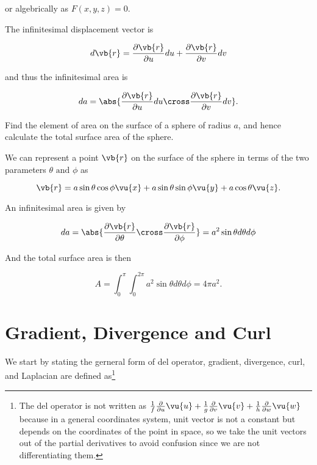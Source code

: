 \documentclass[english,a4paper,12pt]{report}
\begin{document}
or algebrically as \(F(x,y,z) = 0\). 

The infinitesimal displacement vector is 

\begin{equation}
	d\vb{r} = \frac{\partial \vb{r} }{\partial u} du + \frac{\partial \vb{r} }{\partial v}dv 
\end{equation}

and thus the infinitesimal area is 

\begin{equation}
	da = \abs{\frac{\partial \vb{r} }{\partial u} du \cross \frac{\partial \vb{r} }{\partial v} dv}.
\end{equation}

{Find the element of area on the surface of a sphere of radius \(a\), and hence calculate the total surface area of the sphere.}
{We can represent a point \(\vb{r} \)  on the surface of the sphere in terms of the two parameters \(\theta \text { and } \phi \) as

\begin{equation}
	\vb{r} = a \sin \theta \cos \phi \vu{x} + a \sin \theta \sin \phi \vu{y} + a \cos \theta \vu{z} .
\end{equation}

An infinitesimal area is given by 

\begin{equation}
	da = \abs{\frac{\partial \vb{r} }{\partial \theta } \cross \frac{\partial \vb{r} }{\partial \phi } } = a^2\sin \theta d \theta d \phi 
\end{equation}

And the total surface area is then 

\begin{equation}
	A = \int_{0}^{\pi }\int_{0}^{2\pi } a^2 \sin \theta d \theta d \phi = 4\pi a^2.    
\end{equation}
} 












\section{Gradient, Divergence and Curl} 

We start by stating the gerneral form of del operator, gradient, divergence, curl, and Laplacian are defined as\footnote{The del operator is not written as \(\frac{1}{f} \frac{\partial}{\partial u}\vu{u}  + \frac{1}{g} \frac{\partial}{\partial v}\vu{v} + \frac{1}{h} \frac{\partial}{\partial w}\vu{w}\) because in a general coordinates system, unit vector is not a constant but depends on the coordinates of the point in space, so we take the unit vectors out of the partial derivatives to avoid confusion since we are not differentiating them.}
\end{document}
